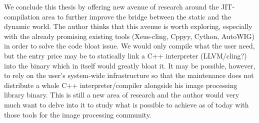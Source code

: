 We conclude this thesis by offering new avenue of research around the JIT-compilation area to further improve the bridge
between the static and the dynamic world. The author thinks that this avenue is worth exploring, especially with the
already promising existing tools (Xeus-cling, Cppyy, Cython, AutoWIG) in order to solve the code bloat issue. We would
only compile what the user need, but the entry price may be to statically link a C++ interpreter (LLVM/cling?) into the
binary which in itself would greatly bloat it. It may be possible, however, to rely on the user's system-wide
infrastructure so that the maintenance does not distribute a whole C++ interpreter/compiler alongside his image
processing library binary. This is still a new area of research and the author would very much want to delve into it to
study what is possible to achieve as of today with those tools for the image processing community.
